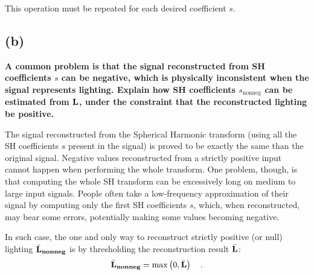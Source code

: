 \documentclass{report}
\begin{document}
This operation must be repeated for each desired coefficient $s$.




\subsection{(b)}
\textbf{A common problem is that the signal reconstructed from SH coefficients $s$ can be negative, which is physically inconsistent when the signal represents lighting. Explain how SH coefficients $s_{\text{nonneg}}$ can be estimated from $\mathbf{L}$, under the constraint that the reconstructed lighting be positive.}


The signal reconstructed from the Spherical Harmonic transform (using all the SH coefficients $s$ present in the signal) is proved to be exactly the same than the original signal. Negative values reconstructed from a strictly positive input cannot happen when performing the whole transform. One problem, though, is that computing the whole SH transform can be excessively long on medium to large input signals. People often take a low-frequency approximation of their signal by computing only the first SH coefficients $s$, which, when reconstructed, may bear some errors, potentially making some values becoming negative.

In such case, the one and only way to reconstruct strictly positive (or null) lighting $\bar{\mathbf{L}}_{\mathbf{nonneg}}$ is by thresholding the reconstruction result $\bar{\mathbf{L}}$:
\begin{equation}
\bar{\mathbf{L}}_{\mathbf{nonneg}} = \max\left( 0, \bar{\mathbf{L}} \right) \quad.
\end{equation}
\end{document}
